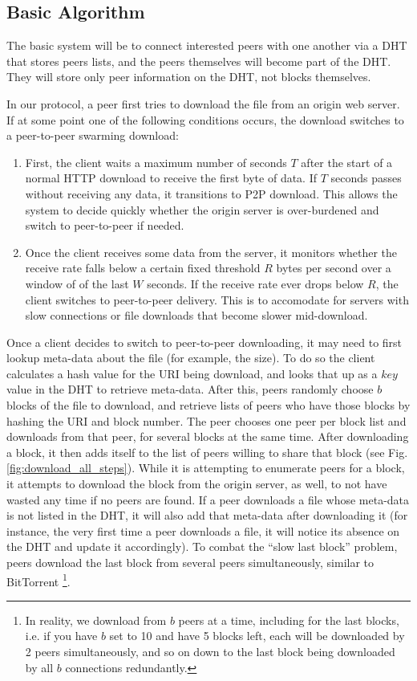 \subsection{Basic Algorithm}

The basic system will be to connect interested peers with one another via a DHT that stores peers lists, and the peers themselves will become part of the DHT.  They will store only peer information on the DHT, not blocks themselves.

In our protocol, a peer first tries to download the file from an origin web server.  If at some point one of the following conditions occurs, the download switches to a peer-to-peer swarming download:
\begin{enumerate}
\item First, the client waits a maximum number of seconds $T$ after the start of a normal HTTP download to receive the first byte of data.  If $T$ seconds passes without receiving any data, it transitions to P2P download.  This allows the system to decide quickly whether the origin server is over-burdened and switch to peer-to-peer if needed.   
\item Once the client receives some data from the server, it monitors whether the receive rate falls below a certain fixed threshold $R$ bytes per second over a window of of the last $W$ seconds.  If the receive rate ever drops below $R$, the client switches to peer-to-peer delivery.  This is to accomodate for servers with slow connections or file downloads that become slower mid-download.
\end{enumerate}

Once a client decides to switch to peer-to-peer downloading, it may need to first lookup meta-data about the file (for example, the size).  To do so the client  calculates a hash value for the URI being download, and looks that up as a $key$ value in the DHT to retrieve meta-data.  After this, peers randomly choose $b$ blocks of the file to download, and retrieve lists of peers who have those blocks by hashing the URI and block number.  The peer chooses one peer per block list and downloads from that peer, for several blocks at the same time.  After downloading a block, it then adds itself to the list of peers willing to share that block (see Fig. \ref{fig:download_all_steps}).  While it is attempting to enumerate peers for a block, it attempts to download the block from the origin server, as well, to not have wasted any time if no peers are found.  If a peer downloads a file whose meta-data is not listed in the DHT, it will also add that meta-data after downloading it (for instance, the very first time a peer downloads a file, it will notice its absence on the DHT and update it accordingly).  To combat the ``slow last block'' problem,  peers download the last block from several peers simultaneously, similar to BitTorrent \footnote{In reality, we download from $b$ peers at a time, including for the last blocks, i.e. if you have $b$ set to 10 and have 5 blocks left, each will be downloaded by 2 peers simultaneously, and so on down to the last block being downloaded by all $b$ connections redundantly.}.

